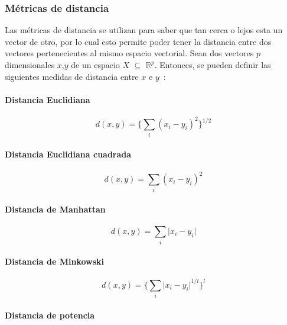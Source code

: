 	\subsubsection{Métricas de distancia}
	\label{sec:matricas_de_distancia}
	Las métricas de distancia se utilizan para saber que tan cerca o lejos esta un vector de otro, por lo cual esto permite poder tener la distancia entre dos vectores pertenecientes al mismo espacio vectorial. 
	Sean dos vectores $p$ dimensionales $x$,$y$ de un espacio $X$ $\subseteq$ $\mathds{R}^p$. Entonces, se pueden definir las siguientes medidas de distancia entre $x$ e $y$~\cite{Pereira2010}:
	
\paragraph{Distancia Euclidiana}\label{deuclidiana}

\begin{equation}
d(x,y) = \Big\{\sum_{i} (x_i-y_i)^2\Big\}^{1/2}
\end{equation}


\paragraph{Distancia Euclidiana cuadrada}\label{deuclidianacuad}

\begin{equation}
d(x,y) = \sum_{i} (x_i-y_i)^2
\end{equation}


\paragraph{Distancia de Manhattan}\label{dmanhattan}

\begin{equation}
d(x,y) = \sum_{i} \vert x_i-y_i\vert
\end{equation}

\paragraph{Distancia de Minkowski}\label{dminkowski}

\begin{equation}
d(x,y) =\Big\{ \sum_{i} \vert x_i-y_i\vert^{1/l}\Big\}^l
\end{equation}


\paragraph{Distancia de potencia}\label{dpotencia}

